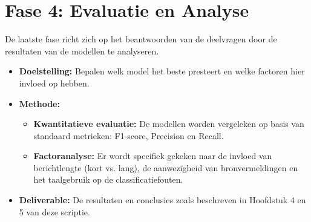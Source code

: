 \documentclass[a4paper,11pt]{report}
\begin{document}
\section{Fase 4: Evaluatie en Analyse}
De laatste fase richt zich op het beantwoorden van de deelvragen door de resultaten van de modellen te analyseren.
\begin{itemize}
    \item \textbf{Doelstelling:} Bepalen welk model het beste presteert en welke factoren hier invloed op hebben.
    \item \textbf{Methode:}
    \begin{itemize}
        \item \textbf{Kwantitatieve evaluatie:} De modellen worden vergeleken op basis van standaard metrieken: F1-score, Precision en Recall.
        \item \textbf{Factoranalyse:} Er wordt specifiek gekeken naar de invloed van berichtlengte (kort vs. lang), de aanwezigheid van bronvermeldingen en het taalgebruik op de classificatiefouten.
    \end{itemize}
    \item \textbf{Deliverable:} De resultaten en conclusies zoals beschreven in Hoofdstuk 4 en 5 van deze scriptie.
\end{itemize}
\end{document}
